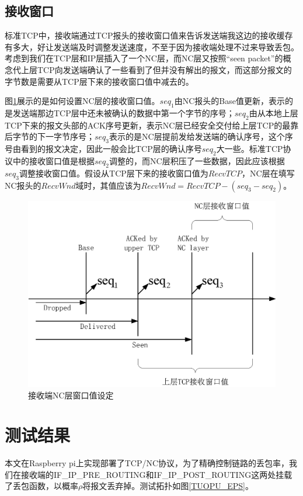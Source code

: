 \subsection{接收窗口}
标准TCP中，接收端通过TCP报头的接收窗口值来告诉发送端我这边的接收缓存有多大，好让发送端及时调整发送速度，不至于因为接收端处理不过来导致丢包。考虑到我们在TCP层和IP层插入了一个NC层，而NC层又按照“seen packet”的概念代上层TCP向发送端确认了一些看到了但并没有解出的报文，而这部分报文的字节数是需要从TCP层下来的接收窗口值中减去的。
\par
图\ref{RCVWND_EPS}展示的是如何设置NC层的接收窗口值。$seq_{1}$由NC报头的Base值更新，表示的是发送端那边TCP层中还未被确认的数据中第一个字节的序号；$seq_{2}$由从本地上层TCP下来的报文头部的ACK序号更新，表示NC层已经安全交付给上层TCP的最靠后字节的下一字节序号；$seq_{3}$表示的是NC层提前发给发送端的确认序号，这个序号由看到的报文决定，因此一般会比TCP层的确认序号$seq_{2}$大一些。标准TCP协议中的接收窗口值是根据$seq_{2}$调整的，而NC层积压了一些数据，因此应该根据$seq_{3}$调整接收窗口值。假设从TCP层下来的接收窗口值为$RecvTCP$，NC层在填写NC报头的$RecvWnd$域时，其值应该为$RecvWnd=RecvTCP-\left(seq_{3}-seq_{2}\right)$。
\begin{figure}[htbp]
	\centering
	\includegraphics[width=5in]{figures/rcvwnd.eps}
	\caption{接收端NC层窗口值设定}
	\label{RCVWND_EPS}
\end{figure}
\section{测试结果}
本文在Raspberry pi上实现部署了TCP/NC协议，为了精确控制链路的丢包率，我们在接收端的IF\_IP\_PRE\_ROUTING和IF\_IP\_POST\_ROUTING这两处挂载了丢包函数，以概率$\rho$将报文丢弃掉。测试拓扑如图\ref{TUOPU_EPS}。

